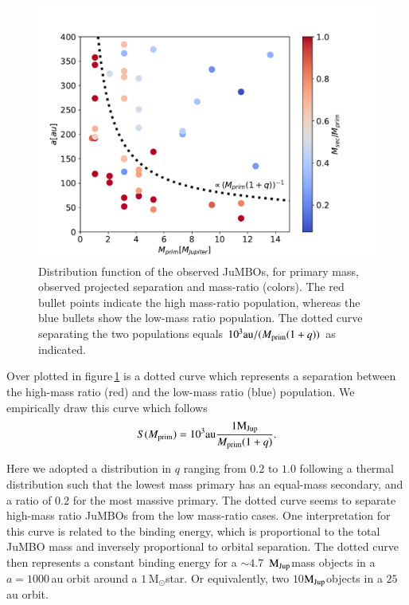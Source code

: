 \documentclass[submission,phys]{lib/SciPost}
\newcommand{\MSun}{\mbox{$\mathrm{{M}}_\odot$}}
\newcommand{\MJup}{\mbox{$\mathrm{{M}}_{\rm Jup}$}}
\newcommand{\jumbos}{\mbox{JuMBOs}}
\begin{document}
\begin{figure}
    \centering
    \includegraphics[width=0.75\columnwidth]{figures/fig_obs_mprim_vs_separation_in_q.pdf}
    \caption{Distribution function of the observed \jumbos, for
      primary mass, observed projected separation and mass-ratio
      (colors). The red bullet points indicate the high mass-ratio
      population, whereas the blue bullets show the low-mass ratio
      population.  The dotted curve separating the two populations
      equals $10^3{\rm au}/(M_{\rm prim}(1+q))$ as indicated.  }
    \label{Fig:obs_q_mprim_sep}
\end{figure}


Over plotted in figure\,\ref{Fig:obs_q_mprim_sep} is a dotted curve
which represents a separation between the high-mass ratio (red) and
the low-mass ratio (blue) population. We empirically draw this curve
which follows
\begin{equation}
  S(M_{\rm prim}) = 10^3 {\rm au} {1 \MJup \over M_{\rm prim}(1+q)}.
\end{equation}

Here we adopted a distribution in $q$ ranging from $0.2$ to $1.0$
following a thermal distribution such that the lowest mass primary has
an equal-mass secondary, and a ratio of $0.2$ for the most massive
primary. The dotted curve seems to separate high-mass ratio JuMBOs
from the low mass-ratio cases.  One interpretation for this curve is
related to the binding energy, which is proportional to the total
JuMBO mass and inversely proportional to orbital separation.  The
dotted curve then represents a constant binding energy for a $\sim
4.7$\, \MJup mass objects in a $a = 1000$\,au orbit around a
$1$\,\MSun star. Or equivalently, two $10$\MJup objects in a $25$\,au
orbit.
\end{document}
